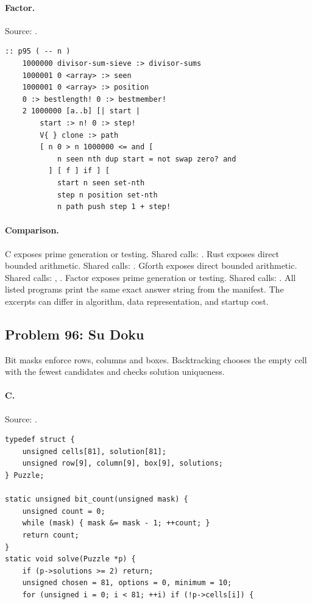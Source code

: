 \paragraph{Factor.} Source: .
\begin{lstlisting}
:: p95 ( -- n )
    1000000 divisor-sum-sieve :> divisor-sums
    1000001 0 <array> :> seen
    1000001 0 <array> :> position
    0 :> bestlength! 0 :> bestmember!
    2 1000000 [a..b] [| start |
        start :> n! 0 :> step!
        V{ } clone :> path
        [ n 0 > n 1000000 <= and [
            n seen nth dup start = not swap zero? and
          ] [ f ] if ] [
            start n seen set-nth
            step n position set-nth
            n path push step 1 + step!
\end{lstlisting}

\paragraph{Comparison.}
C exposes prime generation or testing. Shared calls: \texttt{}. Rust exposes direct bounded arithmetic. Shared calls: \texttt{}. Gforth exposes direct bounded arithmetic. Shared calls: \texttt{}, \texttt{}. Factor exposes prime generation or testing. Shared calls: \texttt{}.
All listed programs print the same exact answer string from the manifest. The excerpts can differ in algorithm, data representation, and startup cost.

\subsection{Problem 96: Su Doku}
\label{walkthrough:p96}
Bit masks enforce rows, columns and boxes. Backtracking chooses the empty cell with the fewest candidates and checks solution uniqueness.

\paragraph{C.} Source: .
\begin{lstlisting}
typedef struct {
    unsigned cells[81], solution[81];
    unsigned row[9], column[9], box[9], solutions;
} Puzzle;

static unsigned bit_count(unsigned mask) {
    unsigned count = 0;
    while (mask) { mask &= mask - 1; ++count; }
    return count;
}
static void solve(Puzzle *p) {
    if (p->solutions >= 2) return;
    unsigned chosen = 81, options = 0, minimum = 10;
    for (unsigned i = 0; i < 81; ++i) if (!p->cells[i]) {
\end{lstlisting}

